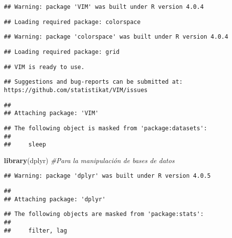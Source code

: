 \documentclass[
]{article}
\newenvironment{Shaded}{\begin{snugshade}}{\end{snugshade}}
\newcommand{\CommentTok}[1]{\textcolor[rgb]{0.56,0.35,0.01}{\textit{#1}}}
\newcommand{\KeywordTok}[1]{\textcolor[rgb]{0.13,0.29,0.53}{\textbf{#1}}}
\newcommand{\NormalTok}[1]{#1}
\begin{document}
\begin{verbatim}
## Warning: package 'VIM' was built under R version 4.0.4
\end{verbatim}

\begin{verbatim}
## Loading required package: colorspace
\end{verbatim}

\begin{verbatim}
## Warning: package 'colorspace' was built under R version 4.0.4
\end{verbatim}

\begin{verbatim}
## Loading required package: grid
\end{verbatim}

\begin{verbatim}
## VIM is ready to use.
\end{verbatim}

\begin{verbatim}
## Suggestions and bug-reports can be submitted at: https://github.com/statistikat/VIM/issues
\end{verbatim}

\begin{verbatim}
## 
## Attaching package: 'VIM'
\end{verbatim}

\begin{verbatim}
## The following object is masked from 'package:datasets':
## 
##     sleep
\end{verbatim}

\begin{Shaded}
\begin{Highlighting}[]
\KeywordTok{library}\NormalTok{(dplyr) }\CommentTok{#Para la manipulación de bases de datos}
\end{Highlighting}
\end{Shaded}

\begin{verbatim}
## Warning: package 'dplyr' was built under R version 4.0.5
\end{verbatim}

\begin{verbatim}
## 
## Attaching package: 'dplyr'
\end{verbatim}

\begin{verbatim}
## The following objects are masked from 'package:stats':
## 
##     filter, lag
\end{verbatim}
\end{document}
